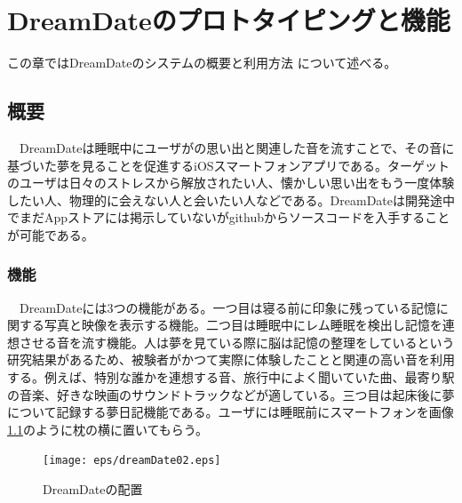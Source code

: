 \chapter{DreamDateのプロトタイピングと機能}
\label{chap:search}

この章ではDreamDateのシステムの概要と利用方法 について述べる。

\section{概要}
　DreamDateは睡眠中にユーザがの思い出と関連した音を流すことで、その音に基づいた夢を見ることを促進するiOSスマートフォンアプリである。ターゲットのユーザは日々のストレスから解放されたい人、懐かしい思い出をもう一度体験したい人、物理的に会えない人と会いたい人などである。DreamDateは開発途中でまだAppストアには掲示していないがgithubからソースコードを入手することが可能である。\\

\subsection{機能}
　DreamDateには3つの機能がある。一つ目は寝る前に印象に残っている記憶に関する写真と映像を表示する機能。二つ目は睡眠中にレム睡眠を検出し記憶を連想させる音を流す機能。人は夢を見ている際に脳は記憶の整理をしているという研究結果があるため、被験者がかつて実際に体験したことと関連の高い音を利用する。例えば、特別な誰かを連想する音、旅行中によく聞いていた曲、最寄り駅の音楽、好きな映画のサウンドトラックなどが適している。三つ目は起床後に夢について記録する夢日記機能である。ユーザには睡眠前にスマートフォンを画像\ref{DreamDateImage}のように枕の横に置いてもらう。\\
\begin{figure}[htbp]
\begin{center}
\texttt{[image: eps/dreamDate02.eps]}
\caption{DreamDateの配置}
\label{DreamDateImage}
\end{center}
\end{figure}

